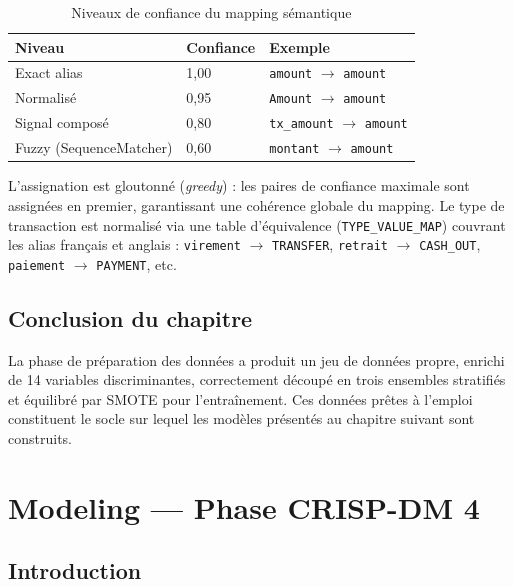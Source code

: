 \documentclass[12pt,a4paper,twoside]{report}
\theoremstyle{definition}
\begin{document}
\begin{table}[H]
\centering
\caption{Niveaux de confiance du mapping sémantique}
\label{tab:mapping_confidence}
\renewcommand{\arraystretch}{1.3}
\begin{tabular}{lll}
\toprule
\textbf{Niveau} & \textbf{Confiance} & \textbf{Exemple} \\
\midrule
Exact alias    & 1,00 & \texttt{amount} $\to$ \texttt{amount} \\
Normalisé      & 0,95 & \texttt{Amount} $\to$ \texttt{amount} \\
Signal composé & 0,80 & \texttt{tx\_amount} $\to$ \texttt{amount} \\
Fuzzy (SequenceMatcher) & 0,60 & \texttt{montant} $\to$ \texttt{amount} \\
\bottomrule
\end{tabular}
\end{table}

L'assignation est gloutonné (\textit{greedy}) : les paires de confiance maximale
sont assignées en premier, garantissant une cohérence globale du mapping.
Le type de transaction est normalisé via une table d'équivalence
(\texttt{TYPE\_VALUE\_MAP}) couvrant les alias français et anglais :
\texttt{virement} $\to$ \texttt{TRANSFER}, \texttt{retrait} $\to$ \texttt{CASH\_OUT},
\texttt{paiement} $\to$ \texttt{PAYMENT}, etc.

\section{Conclusion du chapitre}

La phase de préparation des données a produit un jeu de données propre, enrichi
de 14 variables discriminantes, correctement découpé en trois ensembles stratifiés
et équilibré par SMOTE pour l'entraînement. Ces données prêtes à l'emploi constituent
le socle sur lequel les modèles présentés au chapitre suivant sont construits.

\chapter{Modeling — Phase CRISP-DM 4}
\label{chap:modeling}

\section{Introduction}
\end{document}
